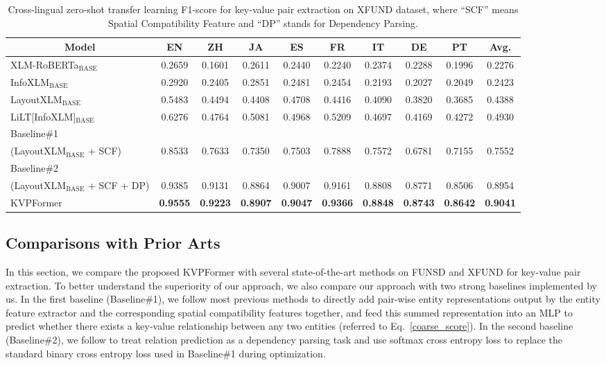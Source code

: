 \documentclass[letterpaper]{article}
\def \Ours {KVPFormer}
\begin{document}
\begin{table}[!]
\small
\centering
\begin{tabular}{lccccccccc}
\toprule
\multicolumn{1}{c}{\bf Model} & \bf EN & \bf ZH & \bf JA & \bf ES & \bf FR & \bf IT & \bf DE & \bf PT & \bf Avg. \\ \midrule \midrule
XLM-RoBERTa$_{\mathrm{BASE}}$ &  0.2659 &0.1601& 0.2611 &0.2440 &0.2240 &0.2374 &0.2288 &0.1996& 0.2276 \\
InfoXLM$_{\mathrm{BASE}}$ &  0.2920& 0.2405 &0.2851 &0.2481 &0.2454& 0.2193 &0.2027 &0.2049 &0.2423  \\
LayoutXLM$_{\mathrm{BASE}}$ &  0.5483& 0.4494& 0.4408 &0.4708 &0.4416 &0.4090 &0.3820& 0.3685 &0.4388  \\
LiLT[InfoXLM]$_{\mathrm{BASE}}$ & 0.6276&0.4764 & 0.5081 & 0.4968 & 0.5209  &  0.4697   & 0.4169  & 0.4272 & 0.4930 \\
Baseline\#1 \\
(LayoutXLM$_{\mathrm{BASE}}$ + SCF)
&    0.8533 &  0.7633 &  0.7350 &  0.7503 &  0.7888  & 0.7572 &  0.6781  & 0.7155 &  0.7552\\
Baseline\#2 \\
(LayoutXLM$_{\mathrm{BASE}}$ + SCF + DP)
& 0.9385 &  0.9131 &  0.8864 &  0.9007 &  0.9161  & 0.8808 &  0.8771  & 0.8506 &  0.8954 \\
\midrule \midrule
\Ours{} &   \bf 0.9555 & \bf 0.9223 & \bf 0.8907 & \bf 0.9047 & \bf 0.9366  & \bf 0.8848 & \bf 0.8743  & \bf 0.8642 &  \bf 0.9041 \\ \bottomrule
\end{tabular}
\caption{Cross-lingual zero-shot transfer learning F1-score for key-value pair extraction on XFUND dataset, where ``SCF'' means Spatial Compatibility Feature and ``DP'' stands for Dependency Parsing.}
\label{tab:xfunsd-zero-shot}
\end{table}

\subsection{Comparisons with Prior Arts}
In this section, we compare the proposed \Ours{} with several state-of-the-art methods on FUNSD and XFUND for key-value pair extraction. To better understand the superiority of our approach, we also compare our approach with two strong baselines implemented by us. In the first baseline (Baseline\#1), we follow most previous methods to directly add pair-wise entity representations output by the entity feature extractor and the corresponding spatial compatibility features together, and feed this summed representation into an MLP to predict whether there exists a key-value relationship between any two entities (referred to Eq.~\ref{coarse_score}). In the second baseline (Baseline\#2), we follow \cite{zhang2021entity} to treat relation prediction as a dependency parsing task and use softmax cross entropy loss to replace the standard binary cross entropy loss used in Baseline\#1 during optimization.
\end{document}
